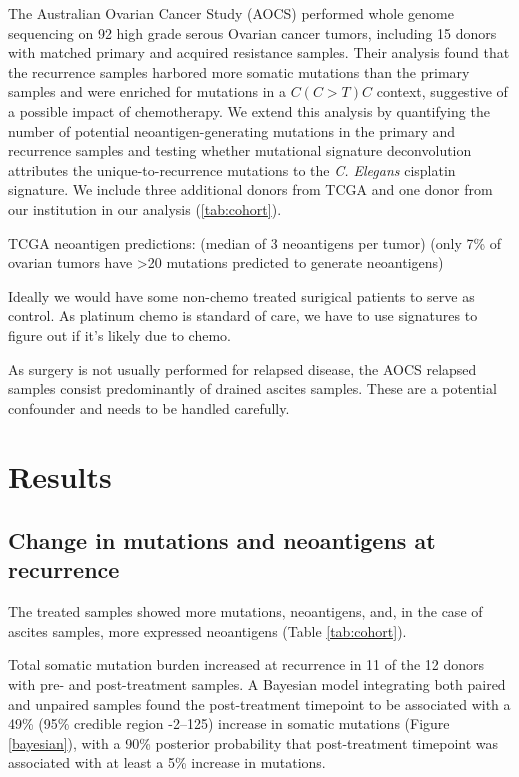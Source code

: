 The Australian Ovarian Cancer Study (AOCS)\cite{Patch_2015} performed whole genome sequencing on 92 high grade serous Ovarian cancer tumors, including 15 donors with matched primary and acquired resistance samples. Their analysis found that the recurrence samples harbored more somatic mutations than the primary samples and were enriched for mutations in a $C(C \gt T)C$ context, suggestive of a possible impact of chemotherapy. We extend this analysis by quantifying the number of potential neoantigen-generating mutations in the primary and recurrence samples and testing whether mutational signature deconvolution attributes the unique-to-recurrence mutations to the \textit{C. Elegans} cisplatin signature. We include three additional donors from TCGA and one donor from our institution in our analysis (\ref{tab:cohort}).

TCGA neoantigen predictions: \cite{Brown_2014} (median of 3 neoantigens per tumor) \cite{Rooney_2015} (only 7\% of ovarian tumors have >20 mutations predicted to generate neoantigens)

Ideally we would have some non-chemo treated surigical patients to serve as control. As platinum chemo is standard of care, we have to use signatures to figure out if it's likely due to chemo.

As surgery is not usually performed for relapsed disease, the AOCS relapsed samples consist predominantly of drained ascites samples. These are a potential confounder and needs to be handled carefully.


\section*{Results}

\subsection*{Change in mutations and neoantigens at recurrence}
The treated samples showed more mutations, neoantigens, and, in the case of ascites samples, more expressed neoantigens (Table \ref{tab:cohort}).

Total somatic mutation burden increased at recurrence in 11 of the 12 donors with pre- and post-treatment samples. A Bayesian model integrating both paired and unpaired samples found the post-treatment timepoint to be associated with a 49\% (95\% credible region -2--125) increase in somatic mutations (Figure \ref{bayesian}), with a 90\% posterior probability that post-treatment timepoint was associated with at least a 5\% increase in mutations. 

